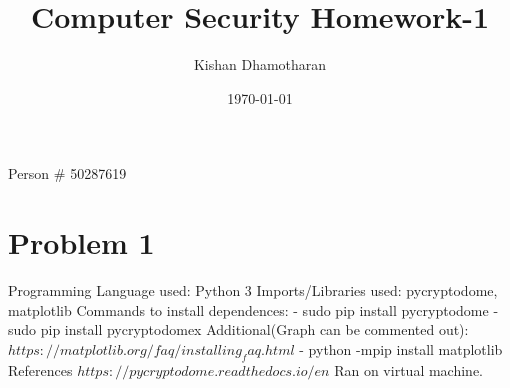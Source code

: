 \documentclass[12pt]{article}%
\begin{document}
\title{Computer Security Homework-1}
\author{Kishan Dhamotharan}
\date{\today}
\maketitle
\begin{center}
 Person \# 50287619
\end{center}
\section{Problem 1}

Programming Language used: Python 3\newline
Imports/Libraries used: pycryptodome, matplotlib\newline
Commands to install dependences:\newline
- sudo pip install pycryptodome\newline
- sudo pip install pycryptodomex\newline
Additional(Graph can be commented out):\newline
$https://matplotlib.org/faq/installing_faq.html$\newline
- python -mpip install matplotlib \newline
References
$https://pycryptodome.readthedocs.io/en$\newline
Ran on virtual machine.
\end{document}
